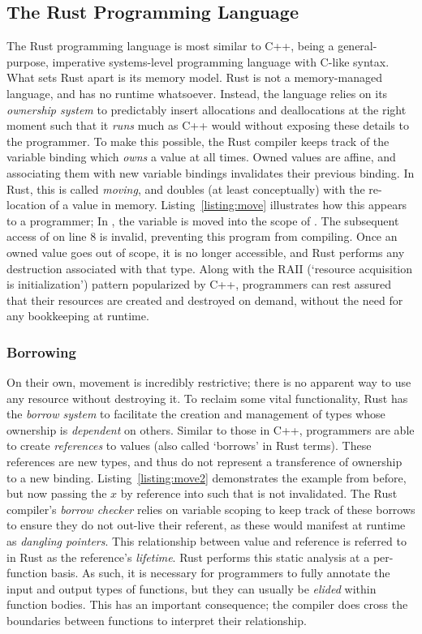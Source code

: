 \subsection{The Rust Programming Language}
\label{sec:rust_language}
The Rust programming language is most similar to C++, being a general-purpose, imperative systems-level programming language with C-like syntax. What sets Rust apart is its memory model. Rust is not a memory-managed language, and has no runtime whatsoever. Instead, the language relies on its \textit{ownership system} to predictably insert allocations and deallocations at the right moment such that it \textit{runs} much as C++ would without exposing these details to the programmer. To make this possible, the Rust compiler keeps track of the variable binding which \textit{owns} a value at all times. Owned values are affine, and associating them with new variable bindings invalidates their previous binding. In Rust, this is called \textit{moving}, and doubles (at least conceptually) with the re-location of a value in memory. Listing~\ref{listing:move} illustrates how this appears to a programmer; In , the variable  is moved into the scope of . The subsequent access of  on line 8 is invalid, preventing this program from compiling. Once an owned value goes out of scope, it is no longer accessible, and Rust performs any destruction associated with that type. Along with the RAII (`resource acquisition is initialization') pattern popularized by C++, programmers can rest assured that their resources are created and destroyed on demand, without the need for any bookkeeping at runtime.

\subsubsection{Borrowing}

On their own, movement is incredibly restrictive; there is no apparent way to use any resource without destroying it. To reclaim some vital functionality, Rust has the \textit{borrow system} to facilitate the creation and management of types whose ownership is \textit{dependent} on others. Similar to those in C++, programmers are able to create \textit{references} to values (also called `borrows' in Rust terms). These references are new types, and thus do not represent a transference of ownership to a new binding. Listing~\ref{listing:move2} demonstrates the example from before, but now passing the $x$ by reference into  such that  is not invalidated. The Rust compiler's \textit{borrow checker} relies on variable scoping to keep track of these borrows to ensure they do not out-live their referent, as these would manifest at runtime as \textit{dangling pointers}. This relationship between value and reference is referred to in Rust as the reference's \textit{lifetime}. Rust performs this static analysis at a per-function basis. As such, it is necessary for programmers to fully annotate the input and output types of functions, but they can usually be \textit{elided} within function bodies. This has an important consequence; the compiler does cross the boundaries between functions to interpret their relationship. 

